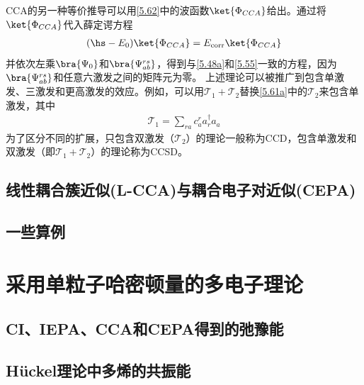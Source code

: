CCA的另一种等价推导可以用\autoref{5.62}中的波函数$\ket{\Phi_{CCA}}$给出。通过将$\ket{\Phi_{CCA}}$代入薛定谔方程
\begin{align*}
    (\hs-E_0)\ket{\Phi_{CCA}}=E_{\text{corr}}\ket{\Phi_{CCA}}
\end{align*}
并依次左乘$\bra{\Psi_0}$和$\bra{\Psi^{rs}_{ab}}$，得到与\autoref{5.48a}和\autoref{5.55}一致的方程，因为$\bra{\Psi^{rs}_{ab}}$和任意六激发之间的矩阵元为零。
上述理论可以被推广到包含单激发、三激发和更高激发的效应。例如，可以用$\mathscr{T}_1+\mathscr{T}_2$替换\autoref{5.61a}中的$\mathscr{T}_2$来包含单激发，其中
\begin{align*}
    \mathscr{T}_1=\sum_{ra}c^r_aa^{\dagger}_ra_a
\end{align*}
为了区分不同的扩展，只包含双激发（$\mathscr{T}_2$）的理论一般称为CCD，包含单激发和双激发（即$\mathscr{T}_1+\mathscr{T}_2$）的理论称为CCSD。
\subsection{线性耦合簇近似(L-CCA)与耦合电子对近似(CEPA)}\label{sec5.2.3}
\subsection{一些算例}

\section{采用单粒子哈密顿量的多电子理论}
\subsection{CI、IEPA、CCA和CEPA得到的弛豫能}
\subsection{H\"uckel理论中多烯的共振能}
\label{sec:5.3.2}
\theendnotes
